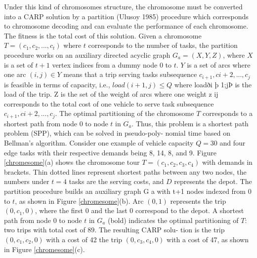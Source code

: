 \documentclass[journal,twoside,web]{ieeecolor}
\begin{document}
\par
Under this kind of chromosomes structure, the chromosome must be converted into a CARP solution by a partition (Ulusoy 1985)\cite{Ulusoy1985} procedure which corresponds to chromosome decoding and can evaluate the performance of each chromosome. The fitness is the total cost of this solution. Given a chromosome $T=(c_1, c_2,...,c_t)$ where $t$ corresponds to the number of tasks, the partition procedure works on an auxiliary directed acyclic graph $G_a=(X,Y,Z)$, where $X$ is a set of $t+1$ vertex indices from a dummy node $0$ to $t$. $Y$ is a set of arcs where one arc $(i,j)\in Y$ means that a trip serving tasks subsequence $c_{i+1}, c{i+2},...,c_j$ is feasible in terms of capacity, i.e., $load(i+1,j)\leq Q$ where loadði þ 1;jÞ is the load of the trip.
Z is the set of the weight of arcs where one weight z ij corresponds to the total cost of one vehicle to serve task subsequence $c_{i+1}, c{i+2},...,c_j$. The optimal partitioning of the chromosome $T$ corresponds to a shortest path from node $0$ to node $t$ in $G_a$. Thus, this problem is a shortest path problem (SPP), which can be solved in pseudo-poly-
nomial time based on Bellman’s algorithm.
Consider one example of vehicle capacity $Q=30$ and four edge tasks with their respective demands being 8, 14, 8, and 9. Figure \ref{chromesome}(a) shows the chromosome tour $T=(c_1, c_2,c_3,c_4)$ with demands in brackets. Thin dotted lines represent shortest paths between any two nodes, the numbers under $t=4$ tasks are the serving costs, and $D$ represents the depot. The partition procedure builds an auxiliary graph G a with t+1 nodes indexed from $0$ to $t$, as shown in Figure \ref{chromesome}(b). Arc $(0, 1)$ represents the trip $(0, c_1 , 0)$, where the first $0$ and the last $0$ correspond to the depot. A shortest path from node $0$ to node $t$ in $G_a$ (bold) indicates the optimal partitioning of $T$: two trips with total cost of $89$. The resulting CARP solu-
tion is the trip $(0, c_1 , c_2 , 0)$ with a cost of 42 the trip $(0, c_3 , c_4 , 0)$ with a cost of 47, as shown in Figure \ref{chromesome}(c).
\end{document}
